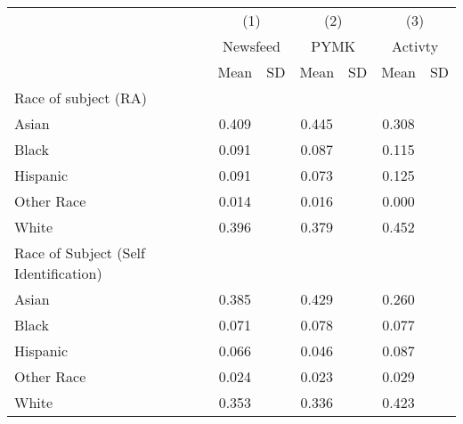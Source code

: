 {
\def\sym#1{\ifmmode^{#1}\else\(^{#1}\)\fi}
\begin{tabular}{l*{3}{cc}}
\toprule
                    &\multicolumn{2}{c}{(1)}  &\multicolumn{2}{c}{(2)}  &\multicolumn{2}{c}{(3)}  \\
                    &\multicolumn{2}{c}{Newsfeed}&\multicolumn{2}{c}{PYMK} &\multicolumn{2}{c}{Activty}\\
                    &        Mean&          SD&        Mean&          SD&        Mean&          SD\\
\midrule
Race of subject (RA)&            &            &            &            &            &            \\
\hspace{3mm} Asian  &       0.409&            &       0.445&            &       0.308&            \\
\hspace{3mm} Black  &       0.091&            &       0.087&            &       0.115&            \\
\hspace{3mm} Hispanic&       0.091&            &       0.073&            &       0.125&            \\
\hspace{3mm} Other Race&       0.014&            &       0.016&            &       0.000&            \\
\hspace{3mm} White  &       0.396&            &       0.379&            &       0.452&            \\
Race of Subject (Self Identification)&            &            &            &            &            &            \\
\hspace{3mm} Asian  &       0.385&            &       0.429&            &       0.260&            \\
\hspace{3mm} Black  &       0.071&            &       0.078&            &       0.077&            \\
\hspace{3mm} Hispanic&       0.066&            &       0.046&            &       0.087&            \\
\hspace{3mm} Other Race&       0.024&            &       0.023&            &       0.029&            \\
\hspace{3mm} White  &       0.353&            &       0.336&            &       0.423&            \\

\end{tabular}}
